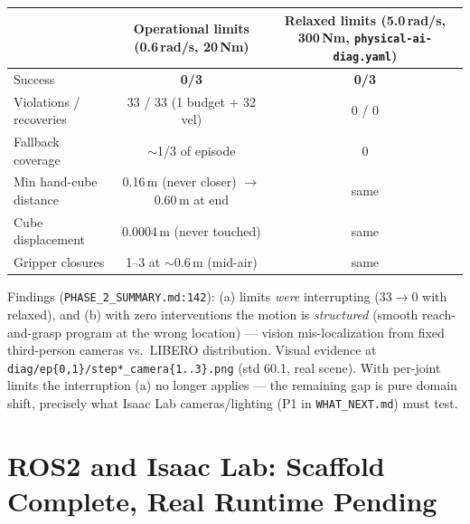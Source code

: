 \documentclass[11pt,a4paper]{article}
\begin{document}
\begin{center}
\small
\begin{tabular}{lcc}
\toprule
 & Operational limits (0.6\,rad/s, 20\,Nm) & Relaxed limits (5.0\,rad/s, 300\,Nm, \texttt{physical-ai-diag.yaml}) \\
\midrule
Success & \textbf{0/3} & \textbf{0/3} \\
Violations / recoveries & 33 / 33 (1 budget + 32 vel) & 0 / 0 \\
Fallback coverage & $\sim$1/3 of episode & 0 \\
Min hand-cube distance & 0.16\,m (never closer) $\rightarrow$ 0.60\,m at end & same \\
Cube displacement & 0.0004\,m (never touched) & same \\
Gripper closures & 1--3 at $\sim$0.6\,m (mid-air) & same \\
\bottomrule
\end{tabular}
\end{center}

Findings (\texttt{PHASE\_2\_SUMMARY.md:142}): (a) limits \textit{were} interrupting (33$\rightarrow$0 with relaxed), and (b) with zero interventions the motion is \textit{structured} (smooth reach-and-grasp program at the wrong location) — vision mis-localization from fixed third-person cameras vs.\ LIBERO distribution. Visual evidence at \texttt{diag/ep\{0,1\}/step*\_camera\{1..3\}.png} (std 60.1, real scene). With per-joint limits the interruption (a) no longer applies — the remaining gap is pure domain shift, precisely what Isaac Lab cameras/lighting (P1 in \texttt{WHAT\_NEXT.md}) must test.

\section{ROS2 and Isaac Lab: Scaffold Complete, Real Runtime Pending}
\end{document}
